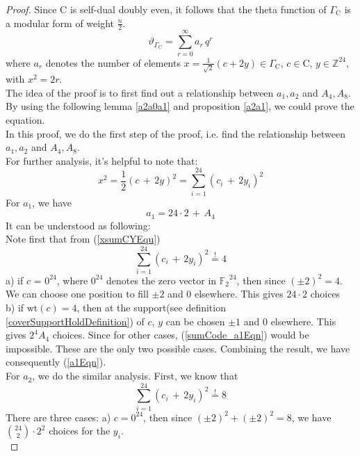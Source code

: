 \documentclass{article}
\numberwithin{equation}{theorem}
\numberwithin{figure}{theorem}
\newcommand{\Ftwo}{\ensuremath{\mathbb{F}_2}}
\newcommand{\simpleCodes}{\ensuremath{\mathrm{C}}}
\newcommand{\buildLattice}[1]{\ensuremath{\Gamma_{#1}}}
\newcommand{\thetaFunction}[1]{\ensuremath{\vartheta_{#1}}}
\newcommand{\wt}[1]{\ensuremath{\text{wt}(#1)}}
\newcommand{\Integer}{\ensuremath{\mathbb{Z}}}
\begin{document}
\begin{proof}
Since {\simpleCodes} is self-dual doubly even, it follows that the theta function of $\buildLattice{\simpleCodes}$ is a modular form of weight $\frac{n}{2}$.\\
\[
	\thetaFunction{\buildLattice{\simpleCodes}} = \sum_{r = 0}^{\infty} a_r \, q^r
\]
where $a_r$ denotes the number of elements $x = \frac{1}{\sqrt{2}}(c + 2y) \in \buildLattice{\simpleCodes},\, c \in \simpleCodes, \, y\in \Integer^{24}$, with $x^2 = 2r$. \\
The idea of the proof is to first find out a relationship between $a_1, a_2$ and $A_4, A_8$. By using the following lemma \ref{a2a0a1} and proposition \ref{a2a1}, we could prove the equation.\\
In this proof, we do the first step of the proof, i.e. find the relationship between $a_1, a_2$ and $A_4, A_8$.\\
For further analysis, it's helpful to note that:
\begin{equation}\label{xsumCYEqu}
	x^2 = \frac{1}{2}(c \,+\,2y)^2 = \sum_{i = 1}^{24}(c_i \, + \, 2y_i)^2
\end{equation}
For $a_1$, we have
\begin{equation}\label{a1Eqn}
	a_1 = 24 \cdot 2 \,+ \,A_4
\end{equation}
It can be understood as following:\\
Note first that from (\ref{xsumCYEqu})
\begin{equation}\label{sumCode_a1Eqn}
	\sum_{i = 1}^{24}(c_i \, + \, 2y_i)^2 \overset{!}{=} 4
\end{equation}
a) if $c$ = $0^{24}$, where $0^{24}$ denotes the zero vector in $\Ftwo^{24}$, then since $(\pm2)^2 = 4$. We can choose one position to fill $\pm2$ and 0 elsewhere. This gives $24 \cdot 2$ choices\\
b) if $\wt{c} = 4$, then at the support(see definition \ref{coverSupportHoldDefinition}) of $c$, $y$ can be chosen $\pm1$ and 0 elsewhere. This gives $2^4 A_4$ choices.
Since for other cases, (\ref{sumCode_a1Eqn}) would be impossible. These are the only two possible cases. Combining the result, we have consequently (\ref{a1Eqn}).\\
For $a_2$, we do the similar analysis. First, we know that
\begin{equation}\label{sumCY_a2Eqn}
	\sum_{i = 1}^{24}(c_i \, + \, 2y_i)^2 \overset{!}{=} 8
\end{equation}
There are three cases:
a) $c = 0^{24}$, then since $(\pm2)^2 + (\pm2)^2 = 8$, we have $\binom{24}{2} \cdot 2^2$ choices for the $y_i$.\\

\end{proof}
\end{document}
